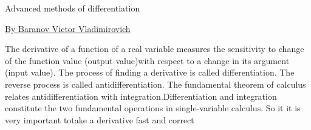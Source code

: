 \documentclass{article}
\begin{document}
\begin{center}
{\LARGE Advanced methods of differentiation}

\end{center}
\begin{center}
{\LARGE \href{https://vk.com/baranov_v_v}{\underline{By Baranov Victor Vladimirovich}}}

\end{center}
The derivative of a function of a real variable measures the sensitivity to change of the function value (output value)with respect to a change in its argument (input value). The process of finding a derivative is called differentiation. The reverse process is called antidifferentiation. The fundamental theorem of calculus relates antidifferentiation with integration.Differentiation and integration constitute the two fundamental operations in single-variable calculus. So it it is very important totake a derivative fast and correct
\end{document}
